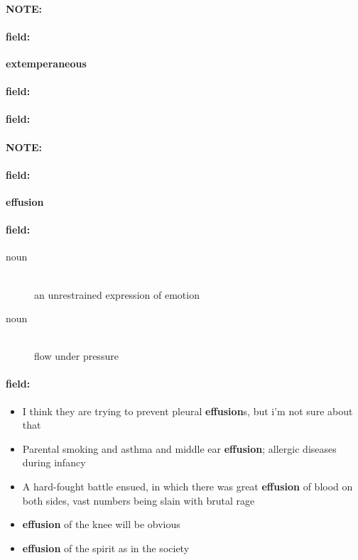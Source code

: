 \documentclass[12pt]{article}
\newenvironment{note}{\paragraph{NOTE:}}{}
\newenvironment{field}{\paragraph{field:}}{}
\begin{document}
\begin{note}
\begin{field}
\textbf{\large extemperaneous}
\end{field}


\begin{field}
\end{field}

\begin{field}
\end{field}
\end{note}
\begin{note}
\begin{field}
\textbf{\large effusion}
\end{field}


\begin{field}
\begin{description}
\item[noun] \hfill \\ 
an unrestrained expression of emotion

\item[noun] \hfill \\ 
flow under pressure

\end{description}
\end{field}

\begin{field}
\begin{itemize}
\item I think they are trying to prevent pleural \textbf{effusion}s, but i'm not sure about that
\item Parental smoking and asthma and middle ear \textbf{effusion}; allergic diseases during infancy
\item A hard-fought battle ensued, in which there was great \textbf{effusion} of blood on both sides, vast numbers being slain with brutal rage
\item \textbf{effusion} of the knee will be obvious
\item \textbf{effusion} of the spirit as in the society
\end{itemize}
\end{field}
\end{note}
\end{document}
